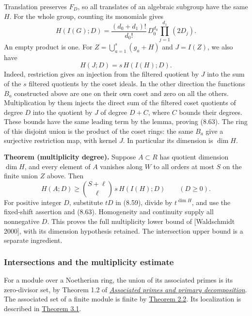 \documentclass[
  11pt,
  a4paper,
]{article}
\begin{document}
Translation preserves \(F_D\), so all translates of an algebraic
subgroup have the same \(H\). For the whole group, counting its
monomials gives \[
H(I(G);D)=
\frac{(d_0+d_1)!}{d_0!}\,
D_0^{d_0}\prod_{j=1}^{d_1}(2D_j).
\tag{8.62}
\] An empty product is one. For \(Z=\bigcup_{a=1}^s(g_a+H)\) and
\(J=I(Z)\), we also have \[
H(J;D)=s\,H(I(H);D).
\tag{8.63}
\] Indeed, restriction gives an injection from the filtered quotient by
\(J\) into the sum of the \(s\) filtered quotients by the coset ideals.
In the other direction the functions \(B_a\) constructed above are one
on their own coset and zero on all the others. Multiplication by them
injects the direct sum of the filtered coset quotients of degree \(D\)
into the quotient by \(J\) of degree \(D+C\), where \(C\) bounds their
degrees. These bounds have the same leading term by the lemma, proving
(8.63). The ring of this disjoint union is the product of the coset
rings: the same \(B_a\) give a surjective restriction map, with kernel
\(J\). In particular its dimension is \(\dim H\).

\textbf{Theorem (multiplicity degree).} Suppose \(A\subset R\) has
quotient dimension \(\dim H\), and every element of \(A\) vanishes along
\(W\) to all orders at most \(S\) on the finite union \(Z\) above. Then
\[
H(A;D)\ge
\binom{S+\ell}{\ell}\,s\,H(I(H);D)
\qquad(D\ge0).
\tag{8.64}
\] For positive integer \(D\), substitute \(tD\) in (8.59), divide by
\(t^{\dim H}\), and use the fixed-shift assertion and (8.63).
Homogeneity and continuity supply all nonnegative \(D\). This proves the
full multiplicity lower bound of {[}Waldschmidt 2000{]}, with its
dimension hypothesis retained. The intersection upper bound is a
separate ingredient.

\subsubsection{Intersections and the multiplicity
estimate}\label{intersections-and-the-multiplicity-estimate}

For a module over a Noetherian ring, the union of its associated primes
is its zero-divisor set, by Theorem 1.2 of
\href{https://kokunoyumeto.github.io/open-math-courses-public/courses/AG-CA/associated-primes-and-primary-decomposition.html\#1-annihilators-that-are-prime}{\emph{Associated
primes and primary decomposition}}. The associated set of a finite
module is finite by
\href{https://kokunoyumeto.github.io/open-math-courses-public/courses/AG-CA/associated-primes-and-primary-decomposition.html\#2-exact-sequences-and-finite-control}{Theorem
2.2}. Its localization is described in
\href{https://kokunoyumeto.github.io/open-math-courses-public/courses/AG-CA/associated-primes-and-primary-decomposition.html\#3-localizing-the-associated-points}{Theorem
3.1}.
\end{document}
